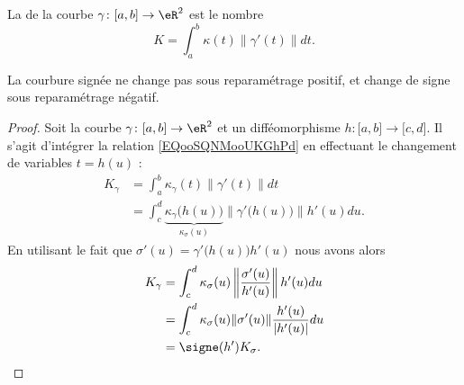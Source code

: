 \begin{definition}
	La  de la courbe \( \gamma\colon \mathopen[ a , b \mathclose] \to \eR^2 \) est le nombre
	\begin{equation}        \label{EQooTIFWooQflOfd}
		K=\int_a^b\kappa(t)\| \gamma'(t) \|dt.
	\end{equation}
\end{definition}

\begin{lemma}
	La courbure signée ne change pas sous reparamétrage positif, et change de signe sous reparamétrage négatif.
\end{lemma}

\begin{proof}
	Soit la courbe \( \gamma\colon \mathopen[ a , b \mathclose]\to \eR^2\) et un difféomorphisme \( h\colon \mathopen[ a , b \mathclose]\to \mathopen[ c , d \mathclose]\). Il s'agit d'intégrer la relation \eqref{EQooSQNMooUKGhPd} en effectuant le changement de variables \( t=h(u)\) :
	\begin{subequations}
		\begin{align}
			K_{\gamma} & =\int_a^b\kappa_{\gamma}(t)\| \gamma'(t) \|dt                                                                   \\
			           & =\int_c^d\underbrace{\kappa_{\gamma}\big( h(u) \big)}_{\kappa_{\sigma}(u)}\| \gamma'\big( h(u) \big) \|h'(u)du.
		\end{align}
	\end{subequations}
	En utilisant le fait que \( \sigma'(u)=\gamma'\big( h(u) \big)h'(u)  \) nous avons alors
	\begin{subequations}
		\begin{align}
			K_{\gamma} & =\int_{c}^d\kappa_{\sigma}(u)\left\| \frac{ \sigma'(u) }{ h'(u) }   \right\|h'(u)du \\
			           & =\int_c^d\kappa_{\sigma}(u)\| \sigma'(u) \|\frac{ h'(u) }{ | h'(u) | }du            \\
			           & =\signe(h')K_{\sigma}.
		\end{align}
	\end{subequations}
\end{proof}

